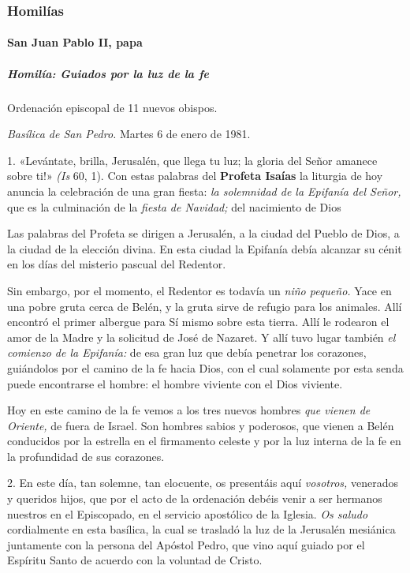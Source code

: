 \documentclass[]{article}
\let\oldparagraph\paragraph
\renewcommand{\paragraph}[1]{\oldparagraph{#1}\mbox{}}
\let\oldsubparagraph\subparagraph
\renewcommand{\subparagraph}[1]{\oldsubparagraph{#1}\mbox{}}
\begin{document}
\subsubsection{Homilías}\label{homiluxedas-11}

\paragraph{San Juan Pablo II, papa}\label{san-juan-pablo-ii-papa-7}

\subparagraph{Homilía: Guiados por la luz de la
fe}\label{homiluxeda-guiados-por-la-luz-de-la-fe}

Ordenación episcopal de 11 nuevos obispos.

\emph{Basílica de San Pedro.} Martes 6 de enero de 1981.

1. «Levántate, brilla, Jerusalén, que llega tu luz; la gloria del Señor
amanece sobre ti!» \emph{(Is} 60, 1). Con estas palabras del
\textbf{Profeta Isaías} la liturgia de hoy anuncia la celebración de una
gran fiesta: \emph{la solemnidad de la Epifanía del Señor,} que es la
culminación de la \emph{fiesta de Navidad;} del nacimiento de Dios

Las palabras del Profeta se dirigen a Jerusalén, a la ciudad del Pueblo
de Dios, a la ciudad de la elección divina. En esta ciudad la Epifanía
debía alcanzar su cénit en los días del misterio pascual del Redentor.

Sin embargo, por el momento, el Redentor es todavía un \emph{niño
pequeño.} Yace en una pobre gruta cerca de Belén, y la gruta sirve de
refugio para los animales. Allí encontró el primer albergue para Sí
mismo sobre esta tierra. Allí le rodearon el amor de la Madre y la
solicitud de José de Nazaret. Y allí tuvo lugar también \emph{el
comienzo de la Epifanía:} de esa gran luz que debía penetrar los
corazones, guiándolos por el camino de la fe hacia Dios, con el cual
solamente por esta senda puede encontrarse el hombre: el hombre viviente
con el Dios viviente.

Hoy en este camino de la fe vemos a los tres nuevos hombres \emph{que
vienen de Oriente,} de fuera de Israel. Son hombres sabios y poderosos,
que vienen a Belén conducidos por la estrella en el firmamento celeste y
por la luz interna de la fe en la profundidad de sus corazones.

2. En este día, tan solemne, tan elocuente, os presentáis aquí
\emph{vosotros,} venerados y queridos hijos, que por el acto de la
ordenación debéis venir a ser hermanos nuestros en el Episcopado, en el
servicio apostólico de la Iglesia. \emph{Os saludo} cordialmente en esta
basílica, la cual se trasladó la luz de la Jerusalén mesiánica
juntamente con la persona del Apóstol Pedro, que vino aquí guiado por el
Espíritu Santo de acuerdo con la voluntad de Cristo.
\end{document}
